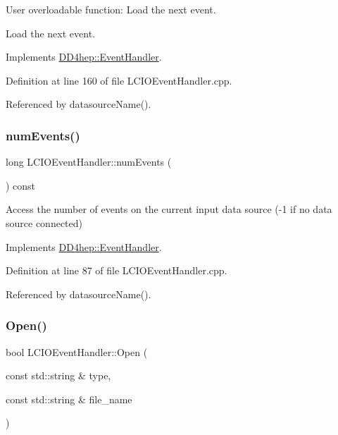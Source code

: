 User overloadable function\+: Load the next event. 

Load the next event. 

Implements \hyperlink{class_d_d4hep_1_1_event_handler_ac2360791d3a44f4cef0987f9a7ec51ce}{D\+D4hep\+::\+Event\+Handler}.



Definition at line 160 of file L\+C\+I\+O\+Event\+Handler.\+cpp.



Referenced by datasource\+Name().

\hypertarget{class_d_d4hep_1_1_l_c_i_o_event_handler_a9fb0b8033c171dc3a41eab1a439547e8}{}\label{class_d_d4hep_1_1_l_c_i_o_event_handler_a9fb0b8033c171dc3a41eab1a439547e8} 
\subsubsection{\texorpdfstring{num\+Events()}{numEvents()}}
{\footnotesize\ttfamily long L\+C\+I\+O\+Event\+Handler\+::num\+Events (\begin{DoxyParamCaption}{ }\end{DoxyParamCaption}) const\hspace{0.3cm}{\ttfamily [virtual]}}



Access the number of events on the current input data source (-\/1 if no data source connected) 



Implements \hyperlink{class_d_d4hep_1_1_event_handler_a005436bba029439b513645485e3c0ff5}{D\+D4hep\+::\+Event\+Handler}.



Definition at line 87 of file L\+C\+I\+O\+Event\+Handler.\+cpp.



Referenced by datasource\+Name().

\hypertarget{class_d_d4hep_1_1_l_c_i_o_event_handler_a67214b5a7675de7d634ac7c1d0cd2c7c}{}\label{class_d_d4hep_1_1_l_c_i_o_event_handler_a67214b5a7675de7d634ac7c1d0cd2c7c} 
\subsubsection{\texorpdfstring{Open()}{Open()}}
{\footnotesize\ttfamily bool L\+C\+I\+O\+Event\+Handler\+::\+Open (\begin{DoxyParamCaption}\item[{const std\+::string \&}]{type,  }\item[{const std\+::string \&}]{file\+\_\+name }\end{DoxyParamCaption})\hspace{0.3cm}{\ttfamily [virtual]}}



